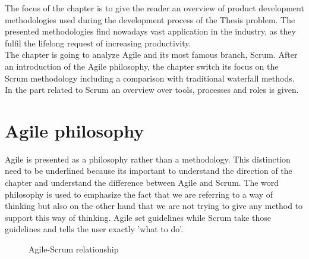 \documentclass[../main.tex]{subfiles}
\begin{document}
The focus of the chapter is to give the reader an overview of product development methodologies used during the development process of the Thesis problem. The presented methodologies find nowadays vast application in the industry, as they fulfil the  lifelong request of increasing productivity.\\
The chapter is going to analyze Agile and its most famous branch, Scrum. After an introduction of the Agile philosophy, the chapter switch its focus on the Scrum methodology including a comparison with traditional waterfall methods. In the part related to Scrum an overview over tools, processes and roles is given.\\
\section{Agile philosophy}
Agile is presented as a philosophy rather than a methodology. This distinction need to be underlined because its important to understand the direction of the chapter and understand the difference between Agile and Scrum.
The word philosophy is used to emphasize the fact that we are referring to a way of thinking but also on the other hand that we are not trying to give any method to support this way of thinking. Agile set guidelines while Scrum take those guidelines and tells the user exactly 'what to do'.
\begin{figure}
    \centering
{} 
    \caption{Agile-Scrum relationship}
    \label{fig:SCRUMAGstr}
\end{figure}
\end{document}
